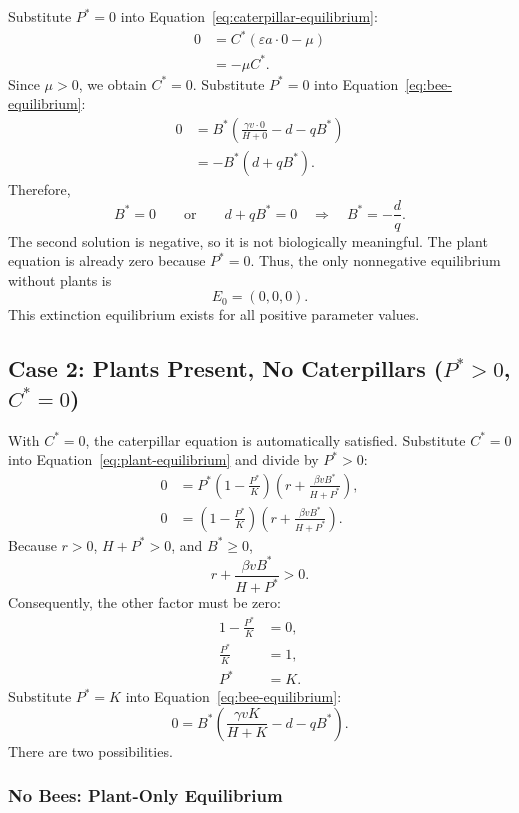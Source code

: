 \documentclass[11pt]{article}
\begin{document}
Substitute $P^*=0$ into Equation~\eqref{eq:caterpillar-equilibrium}:
\begin{align*}
    0 &= C^*(\varepsilon a\cdot 0-\mu) \\
      &= -\mu C^*.
\end{align*}
Since $\mu>0$, we obtain $C^*=0$.
Substitute $P^*=0$ into Equation~\eqref{eq:bee-equilibrium}:
\begin{align*}
    0 &= B^*\left(\frac{\gamma v\cdot 0}{H+0}-d-qB^*\right) \\
      &= -B^*(d+qB^*).
\end{align*}
Therefore,
\[
    B^*=0
    \qquad\text{or}\qquad
    d+qB^*=0
    \quad\Longrightarrow\quad B^*=-\frac{d}{q}.
\]
The second solution is negative, so it is not biologically meaningful.
The plant equation is already zero because $P^*=0$. Thus, the only
nonnegative equilibrium without plants is
\begin{equation}
    E_0=(0,0,0).
\end{equation}
This extinction equilibrium exists for all positive parameter values.

\subsection{Case 2: Plants Present, No Caterpillars ($P^*>0$, $C^*=0$)}

With $C^*=0$, the caterpillar equation is automatically satisfied.
Substitute $C^*=0$ into Equation~\eqref{eq:plant-equilibrium} and divide
by $P^*>0$:
\begin{align*}
    0 &= P^*\left(1-\frac{P^*}{K}\right)
    \left(r+\frac{\beta vB^*}{H+P^*}\right), \\
    0 &= \left(1-\frac{P^*}{K}\right)
    \left(r+\frac{\beta vB^*}{H+P^*}\right).
\end{align*}
Because $r>0$, $H+P^*>0$, and $B^*\geq 0$,
\[
    r+\frac{\beta vB^*}{H+P^*}>0.
\]
Consequently, the other factor must be zero:
\begin{align*}
    1-\frac{P^*}{K} &= 0, \\
    \frac{P^*}{K} &= 1, \\
    P^* &= K.
\end{align*}
Substitute $P^*=K$ into Equation~\eqref{eq:bee-equilibrium}:
\[
    0=B^*\left(\frac{\gamma vK}{H+K}-d-qB^*\right).
\]
There are two possibilities.

\subsubsection{No Bees: Plant-Only Equilibrium}
\end{document}

